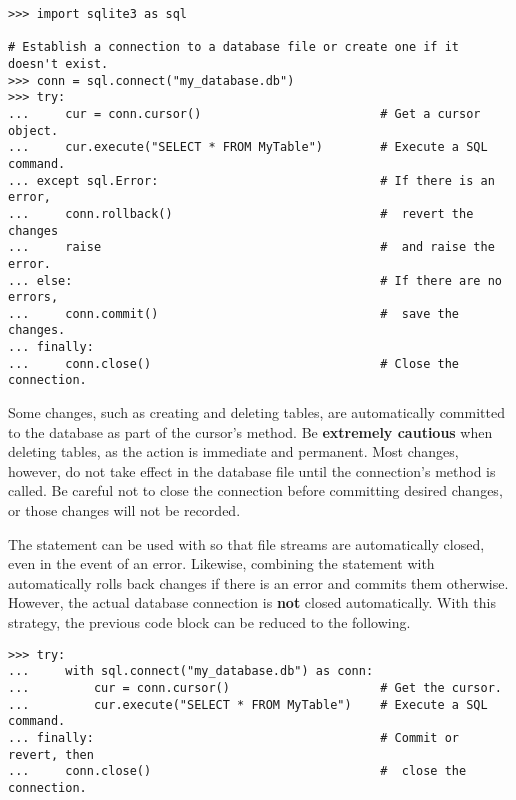 \begin{lstlisting}
>>> import sqlite3 as sql

# Establish a connection to a database file or create one if it doesn't exist.
>>> conn = sql.connect("my_database.db")
>>> try:
...     cur = conn.cursor()                         # Get a cursor object.
...     cur.execute("SELECT * FROM MyTable")        # Execute a SQL command.
... except sql.Error:                               # If there is an error,
...     conn.rollback()                             #  revert the changes
...     raise                                       #  and raise the error.
... else:                                           # If there are no errors,
...     conn.commit()                               #  save the changes.
... finally:
...     conn.close()                                # Close the connection.
\end{lstlisting}

\begin{warn} %
Some changes, such as creating and deleting tables, are automatically committed to the database as part of the cursor's  method.
Be \textbf{extremely cautious} when deleting tables, as the action is immediate and permanent.
Most changes, however, do not take effect in the database file until the connection's  method is called.
Be careful not to close the connection before committing desired changes, or those changes will not be recorded.
\end{warn}

The  statement can be used with  so that file streams are automatically closed, even in the event of an error.
Likewise, combining the  statement with  automatically rolls back changes if there is an error and commits them otherwise.
However, the actual database connection is \textbf{not} closed automatically.
With this strategy, the previous code block can be reduced to the following.

\begin{lstlisting}
>>> try:
...     with sql.connect("my_database.db") as conn:
...         cur = conn.cursor()                     # Get the cursor.
...         cur.execute("SELECT * FROM MyTable")    # Execute a SQL command.
... finally:                                        # Commit or revert, then
...     conn.close()                                #  close the connection.
\end{lstlisting}

